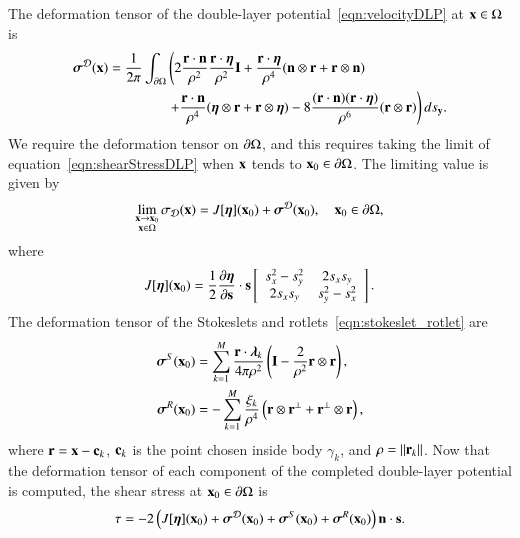 \documentclass[preprint, 10pt]{elsarticle}
\begin{document}
The deformation tensor of the double-layer
potential~\eqref{eqn:velocityDLP} at ${\mathbf{x}} \in \Omega$ is
\begin{equation}
  \label{eqn:shearStressDLP}
  \begin{aligned}
  {\boldsymbol\sigma}^{\mathcal{D}}({\mathbf{x}}) = \frac{1}{2\pi}\int_{{\partial}\Omega} &\left(
    2\frac{{\mathbf{r}} \cdot {\mathbf{n}}}{\rho^2} \frac{{\mathbf{r}} \cdot {\boldsymbol\eta}}{\rho^2} {\mathbf{I}} + 
    \frac{{\mathbf{r}} \cdot {\boldsymbol\eta}}{\rho^4} ({\mathbf{n}} \otimes {\mathbf{r}} + {\mathbf{r}} \otimes {\mathbf{n}}) 
    \right. \\
    &\left.
    +\frac{{\mathbf{r}} \cdot {\mathbf{n}}}{\rho^4} ({\boldsymbol\eta} \otimes {\mathbf{r}} + {\mathbf{r}} \otimes {\boldsymbol\eta}) - 
    8\frac{({\mathbf{r}} \cdot {\mathbf{n}})({\mathbf{r}} \cdot {\boldsymbol\eta})}{\rho^6}({\mathbf{r}} \otimes {\mathbf{r}})
  \right) ds_{\mathbf{y}}.
  \end{aligned}
\end{equation}
We require the deformation tensor on ${\partial}\Omega$, and this requires
taking the limit of equation~\eqref{eqn:shearStressDLP} when ${\mathbf{x}}$ tends
to ${\mathbf{x}}_0 \in {\partial}\Omega$.  The limiting value is given
by~\cite{qua-bir2014a}
\begin{align*}
  \lim_{\substack{{\mathbf{x}} \rightarrow {\mathbf{x}}_0 \\ {\mathbf{x}} \in \Omega}}\sigma_{\mathcal{D}}({\mathbf{x}}) =
  J[{\boldsymbol\eta}]({\mathbf{x}}_0) + {\boldsymbol\sigma}^{\mathcal{D}}({\mathbf{x}}_0), \quad {\mathbf{x}}_0 \in {\partial}\Omega,
\end{align*} 
where
\begin{align*}
  J[{\boldsymbol\eta}]({\mathbf{x}}_0) = \frac{1}{2}\frac{\partial {\boldsymbol\eta}}{\partial {\mathbf{s}}} \cdot {\mathbf{s}}
  \left[ \begin{array}{cc}
    s_x^2 - s_y^2 & 2s_x s_y \\ 2s_x s_y & s_y^2 - s_x^2
  \end{array}\right].
\end{align*}
The deformation tensor of the Stokeslets and
rotlets~\eqref{eqn:stokeslet_rotlet} are
\begin{align*}
  {\boldsymbol\sigma}^S({\mathbf{x}}_0) &= \sum_{k=1}^{M}
    \frac{{\mathbf{r}} \cdot {\boldsymbol\lambda}_k}{4\pi\rho^2} \left(
    {\mathbf{I}} - \frac{2}{\rho^2} {\mathbf{r}} \otimes {\mathbf{r}} \right),  \\
  {\boldsymbol\sigma}^R({\mathbf{x}}_0) &= -\sum_{k=1}^M
    \frac{\xi_k}{\rho^4} \left({\mathbf{r}} \otimes {\mathbf{r}}^\perp + 
    {\mathbf{r}}^\perp \otimes {\mathbf{r}} \right),
\end{align*}
where ${\mathbf{r}} = {\mathbf{x}} - {\mathbf{c}}_k$, ${\mathbf{c}}_k$ is the point chosen inside body
$\gamma_k$, and $\rho = \|{\mathbf{r}}_k\|$.  Now that the deformation tensor of
each component of the completed double-layer potential is computed, the
shear stress at ${\mathbf{x}}_0 \in {\partial}\Omega$ is
\begin{align*}
  \tau = -2 \left(J[{\boldsymbol\eta}]({\mathbf{x}}_0) + {\boldsymbol\sigma}^{\mathcal{D}}({\mathbf{x}}_0) + 
    {\boldsymbol\sigma}^S({\mathbf{x}}_0) + {\boldsymbol\sigma}^R({\mathbf{x}}_0)\right) {\mathbf{n}} \cdot {\mathbf{s}}.
\end{align*}
\end{document}
